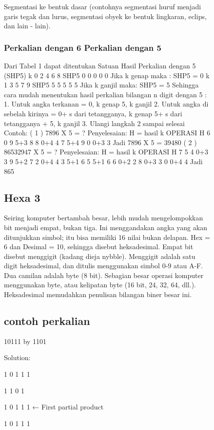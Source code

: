\begin{figure}[ht]
{    \item Segmentasi ke bentuk dasar (contohnya segmentasi huruf menjadi garis tegak dan lurus, segmentasi obyek  ke bentuk 
	lingkaran, eclips, dan lain - lain).
	
	
\subsubsection {Perkalian dengan 6 Perkalian dengan 5}
Dari Tabel 1 dapat ditentukan
Satuan Hasil Perkalian dengan 5 (SHP5)
k 0 2 4 6 8
SHP5 0 0 0 0 0
Jika k genap maka :
SHP5 = 0
k 1 3 5 7 9
SHP5 5 5 5 5 5
Jika k ganjil maka:
SHP5 = 5
Sehingga cara mudah menentukan hasil
perkalian bilangan n digit dengan 5 :
1. Untuk angka terkanan = 0, k genap
5, k ganjil
2. Untuk angka di sebelah kirinya =
0+ s dari tetangganya, k genap
5+ s dari tetangganya + 5, k ganjil
3. Ulangi langkah 2 sampai selesai
Contoh:
( 1 ) 7896 X 5 = ?
Penyelesaian:
H = hasil
k OPERASI H
6 0
9 5+3 8
8 0+4 4
7 5+4 9
0 0+3 3
Jadi 7896 X 5 = 39480
( 2 ) 86532947 X 5 = ?
Penyelesaian:
H = hasil
k OPERASI H
7 5
4 0+3 3
9 5+2 7
2 0+4 4
3 5+1 6
5 5+1 6
6 0+2 2
8 0+3 3
0 0+4 4
Jadi 865

\subsection {Hexa 3}
Seiring komputer bertambah besar, lebih mudah mengelompokkan bit menjadi empat, bukan tiga. Ini menggandakan 
angka yang akan ditunjukkan simbol; itu bisa memiliki 16 nilai bukan delapan. Hex = 6 dan Desimal = 10, sehingga 
disebut heksadesimal. Empat bit disebut menggigit (kadang dieja nybble). Menggigit adalah satu digit heksadesimal, 
dan ditulis menggunakan simbol 0-9 atau A-F. Dua camilan adalah byte (8 bit). Sebagian besar operasi komputer 
menggunakan byte, atau kelipatan byte (16 bit, 24, 32, 64, dll.). Heksadesimal memudahkan penulisan bilangan biner besar ini.


\subsection {contoh perkalian}
10111 by 1101

Solution:

                                1 0 1 1 1

                                   1 1 0 1

                                 1 0 1 1 1           ← First partial product

                            1 0 1 1 1     

}
\end{figure}
